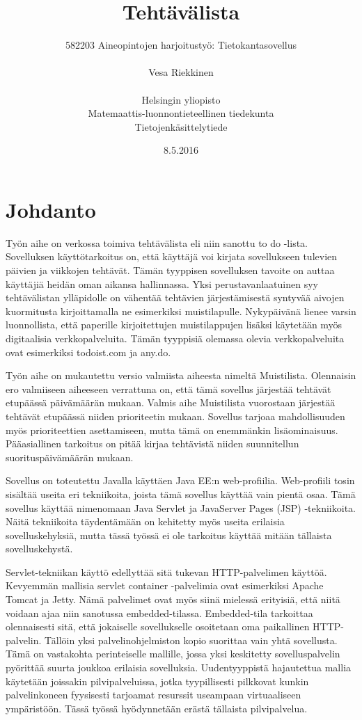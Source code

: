 \documentclass[12pt,a4paper,oneside,titlepage,pdftex]{article}
\title{Tehtävälista}
\date{8.5.2016}
\author{582203 Aineopintojen harjoitustyö: Tietokantasovellus\\ \\ Vesa Riekkinen\\ \\Helsingin yliopisto\\Matemaattis-luonnontieteellinen tiedekunta\\Tietojenkäsittelytiede}
\begin{document}
\maketitle

\setcounter{page}{1}
 
\section{Johdanto}

Työn aihe on verkossa toimiva tehtävälista eli niin sanottu to do -lista. Sovelluksen käyttötarkoitus on, että käyttäjä voi kirjata sovellukseen tulevien päivien ja viikkojen tehtävät. Tämän tyyppisen sovelluksen tavoite on auttaa käyttäjiä heidän oman aikansa hallinnassa. Yksi perustavanlaatuinen syy tehtävälistan ylläpidolle on vähentää tehtävien järjestämisestä syntyvää aivojen kuormitusta kirjoittamalla ne esimerkiksi muistilapulle. Nykypäivänä lienee varsin luonnollista, että paperille kirjoitettujen muistilappujen lisäksi käytetään myös digitaalisia verkkopalveluita. Tämän tyyppisiä olemassa olevia verkkopalveluita ovat esimerkiksi todoist.com ja any.do.

Työn aihe on mukautettu versio valmiista aiheesta nimeltä Muistilista. Olennaisin ero valmiiseen aiheeseen verrattuna on, että tämä sovellus järjestää tehtävät etupäässä päivämäärän mukaan. Valmis aihe Muistilista vuorostaan järjestää tehtävät etupäässä niiden prioriteetin mukaan. Sovellus tarjoaa mahdollisuuden myös prioriteettien asettamiseen, mutta tämä on enemmänkin lisäominaisuus. Pääasiallinen tarkoitus on pitää kirjaa tehtävistä niiden suunnitellun suorituspäivämäärän mukaan.

Sovellus on toteutettu Javalla käyttäen Java EE:n web-profiilia. Web-profiili tosin sisältää useita eri tekniikoita, joista tämä sovellus käyttää vain pientä osaa. Tämä sovellus käyttää nimenomaan Java Servlet ja JavaServer Pages (JSP) -tekniikoita. Näitä tekniikoita täydentämään on kehitetty myös useita erilaisia sovelluskehyksiä, mutta tässä työssä ei ole tarkoitus käyttää mitään tällaista sovelluskehystä.

Servlet-tekniikan käyttö edellyttää sitä tukevan HTTP-palvelimen käyttöä. Kevyemmän mallisia servlet container -palvelimia ovat esimerkiksi Apache Tomcat ja Jetty. Nämä palvelimet ovat myös siinä mielessä erityisiä, että niitä voidaan ajaa niin sanotussa embedded-tilassa. Embedded-tila tarkoittaa olennaisesti sitä, että jokaiselle sovellukselle osoitetaan oma paikallinen HTTP-palvelin. Tällöin yksi palvelinohjelmiston kopio suorittaa vain yhtä sovellusta. Tämä on vastakohta perinteiselle mallille, jossa yksi keskitetty sovelluspalvelin pyörittää suurta joukkoa erilaisia sovelluksia. Uudentyyppistä hajautettua mallia käytetään joissakin pilvipalveluissa, jotka tyypillisesti pilkkovat kunkin palvelinkoneen fyysisesti tarjoamat resurssit useampaan virtuaaliseen ympäristöön. Tässä työssä hyödynnetään erästä tällaista pilvipalvelua.
\end{document}
